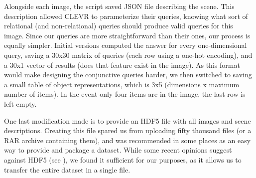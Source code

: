 Alongside each image, the script saved JSON file describing the scene. This description allowed CLEVR to parameterize their queries, knowing what sort of relational (and non-relational) queries should produce valid queries for this image. Since our queries are more straightforward than their ones, our process is equally simpler. Initial versions computed the answer for every one-dimensional query, saving a 30x30 matrix of queries (each row using a one-hot encoding), and a 30x1 vector of results (does that feature exist in the image). As this format would make designing the conjunctive queries harder, we then switched to saving a small table of object representations, which is 3x5 (dimensions x maximum number of items). In the event only four items are in the image, the last row is left empty. 

One last modification made is to provide an HDF5 file \parencite{TheHDFGroup1997} with all images and scene descriptions. Creating this file spared us from uploading fifty thousand files (or a RAR archive containing them), and was recommended in some places as an easy way to provide and package a dataset. While some recent opinions suggest against HDF5 (see \cite{Rossant2016}), we found it sufficient for our purposes, as it allows us to transfer the entire dataset in a single file.
